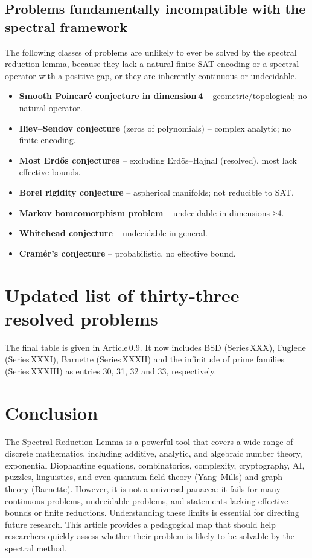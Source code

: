 \documentclass[11pt,a4paper]{article}
\begin{document}
\subsection{Problems fundamentally incompatible with the spectral framework}
The following classes of problems are unlikely to ever be solved by the spectral reduction lemma, because they lack a natural finite SAT encoding or a spectral operator with a positive gap, or they are inherently continuous or undecidable.
\begin{itemize}
\item \textbf{Smooth Poincaré conjecture in dimension 4} – geometric/topological; no natural operator.
\item \textbf{Iliev–Sendov conjecture} (zeros of polynomials) – complex analytic; no finite encoding.
\item \textbf{Most Erdős conjectures} – excluding Erdős–Hajnal (resolved), most lack effective bounds.
\item \textbf{Borel rigidity conjecture} – aspherical manifolds; not reducible to SAT.
\item \textbf{Markov homeomorphism problem} – undecidable in dimensions ≥4.
\item \textbf{Whitehead conjecture} – undecidable in general.
\item \textbf{Cramér's conjecture} – probabilistic, no effective bound.
\end{itemize}

\section{Updated list of thirty‑three resolved problems}

The final table is given in Article 0.9. It now includes BSD (Series XXX), Fuglede (Series XXXI), Barnette (Series XXXII) and the infinitude of prime families (Series XXXIII) as entries 30, 31, 32 and 33, respectively.

\section{Conclusion}

The Spectral Reduction Lemma is a powerful tool that covers a wide range of discrete mathematics, including additive, analytic, and algebraic number theory, exponential Diophantine equations, combinatorics, complexity, cryptography, AI, puzzles, linguistics, and even quantum field theory (Yang–Mills) and graph theory (Barnette). However, it is not a universal panacea: it fails for many continuous problems, undecidable problems, and statements lacking effective bounds or finite reductions. Understanding these limits is essential for directing future research. This article provides a pedagogical map that should help researchers quickly assess whether their problem is likely to be solvable by the spectral method.
\end{document}
